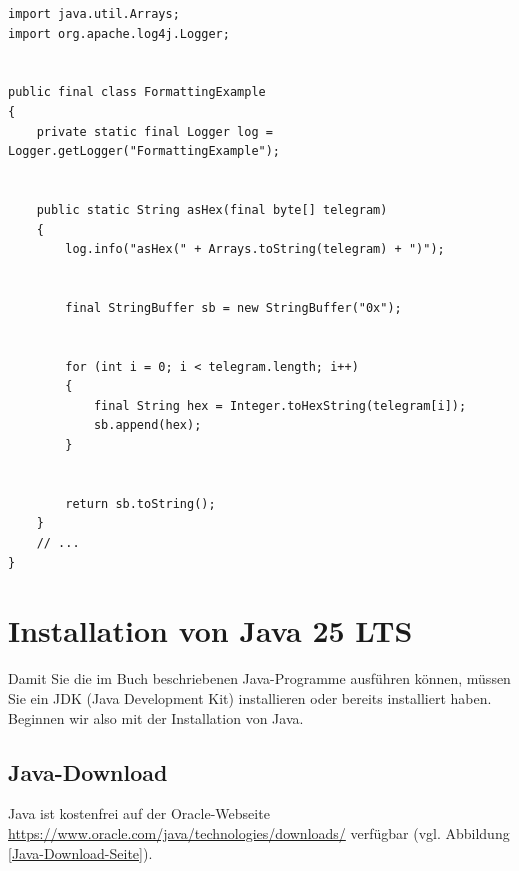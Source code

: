 \lstset{mathescape=true}
\vspace{-0.75mm}
\begin{lstlisting}
import java.util.Arrays;
import org.apache.log4j.Logger;


public final class FormattingExample
{
    private static final Logger log = Logger.getLogger("FormattingExample");


    public static String asHex(final byte[] telegram)
    {
        log.info("asHex(" + Arrays.toString(telegram) + ")");


        final StringBuffer sb = new StringBuffer("0x");


        for (int i = 0; i < telegram.length; i++)
        {
            final String hex = Integer.toHexString(telegram[i]);
            sb.append(hex);
        }


        return sb.toString();
    }
    // ...
}
\end{lstlisting}
\vspace{-0.75mm}
\lstset{mathescape=false}








\vfill
\pagebreak
\section{Installation von Java 25 LTS}
\label{sec:Installation von Java 25 LTS}


Damit Sie die im Buch beschriebenen Java-Programme ausführen können,
müssen Sie ein JDK (Java Development Kit) installieren oder bereits installiert haben.
Beginnen wir also mit der Installation von Java.




\subsection{Java-Download}


Java ist kostenfrei auf der Oracle-Webseite \url{https://www.oracle.com/java/technologies/downloads/}
verfügbar (vgl. Abbildung \ref{Java-Download-Seite}).


